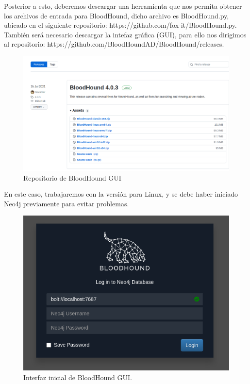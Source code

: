 \documentclass{article}
\begin{document}
Posterior a esto, deberemos descargar una herramienta que nos permita obtener los archivos de entrada para BloodHound, dicho archivo es BloodHound.py, ubicado en el siguiente repositorio: https://github.com/fox-it/BloodHound.py.
También será necesario descargar la intefaz gráfica (GUI), para ello nos dirigimos al repositorio: https://github.com/BloodHoundAD/BloodHound/releases. 

\begin{figure}[H]
	\center
	\includegraphics[width=\textwidth]{images/forest/descargando-elgui.png}
	\caption{Repositorio de BloodHound GUI}
\end{figure}

En este caso, trabajaremos con la versión para Linux, y se debe haber iniciado Neo4j previamente para evitar problemas. 

\begin{figure}[H]
	\center
	\includegraphics[width=\textwidth/2]{images/forest/interfaz_bloodhound.png}
	\caption{Interfaz inicial de BloodHound GUI.}
\end{figure}
\end{document}
